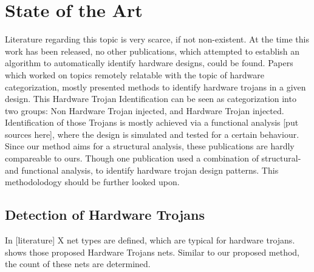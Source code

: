 
\section{State of the Art}
Literature regarding this topic is very scarce, if not non-existent. At the time
this work has been released, no other publications, which attempted to establish 
an algorithm to automatically identify hardware designs, could be found.
Papers which worked on topics remotely relatable with the topic of hardware 
categorization, mostly presented methods to identify hardware trojans in a given 
design. This Hardware Trojan Identification can be seen as categorization into 
two groups: Non Hardware Trojan injected, and Hardware Trojan injected.
Identification of those Trojans is mostly achieved via a functional analysis [put sources here], where the design is simulated and tested for a certain
behaviour. Since our method aims for a structural analysis, these publications 
are hardly compareable to ours. Though one publication used a combination of structural- and 
functional analysis, to identify hardware trojan design patterns. This 
methodolodogy should be further looked upon.  

\subsection{Detection of Hardware Trojans}
In [literature] X net types are defined, which are typical for hardware trojans.
\label{hw_trojan_nets} shows those proposed Hardware Trojans nets. Similar to 
our proposed method, the count of these nets are determined. 
 
